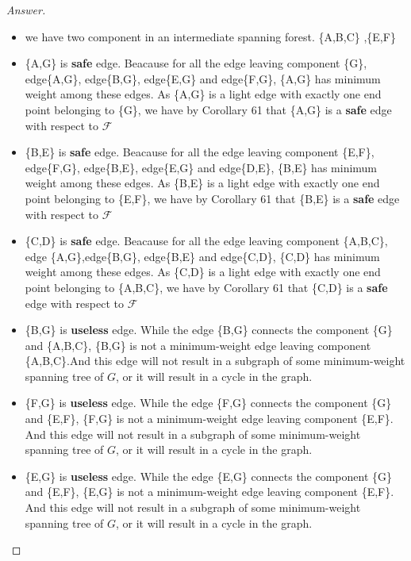 \documentclass[11pt]{article}
\theoremstyle{definition}
\theoremstyle{definition}
\theoremstyle{definition}
\begin{document}
\begin{proof}[Answer]
\begin{itemize}

\item we have two component in an intermediate spanning forest. \{A,B,C\} ,\{E,F\}
\item \{A,G\} is \textbf{safe} edge. Beacause for all the edge leaving component \{G\}, edge\{A,G\}, edge\{B,G\}, edge\{E,G\} and edge\{F,G\}, \{A,G\} has minimum weight among these edges. As \{A,G\} is a light edge with exactly one end point belonging to \{G\}, we have by Corollary 61 that \{A,G\} is a \textbf{safe} edge with respect to $\mathcal{F}$

\item \{B,E\} is \textbf{safe} edge.  Beacause for all the edge leaving component \{E,F\}, edge\{F,G\}, edge\{B,E\}, edge\{E,G\} and edge\{D,E\}, \{B,E\} has minimum weight among these edges. As \{B,E\} is a light edge with exactly one end point belonging to \{E,F\}, we have by Corollary 61 that \{B,E\} is a \textbf{safe} edge with respect to $\mathcal{F}$

\item \{C,D\} is \textbf{safe} edge. Beacause for all the edge leaving component \{A,B,C\}, edge \{A,G\},edge\{B,G\}, edge\{B,E\} and edge\{C,D\}, \{C,D\} has minimum weight among these edges. As \{C,D\} is a light edge with exactly one end point belonging to \{A,B,C\}, we have by Corollary 61 that \{C,D\} is a \textbf{safe} edge with respect to $\mathcal{F}$ 

\item \{B,G\}  is \textbf{useless} edge. While the edge \{B,G\} connects the component \{G\} and \{A,B,C\}, \{B,G\} is not a minimum-weight edge leaving component \{A,B,C\}.And this edge will not result in a subgraph of some minimum-weight spanning tree of $G$, or it will result in a cycle in the graph.

\item \{F,G\} is \textbf{useless} edge. While the edge \{F,G\} connects the component \{G\} and \{E,F\}, \{F,G\} is not a minimum-weight edge leaving component \{E,F\}. And this edge will not result in a subgraph of some minimum-weight spanning tree of $G$, or it will result in a cycle in the graph.

\item \{E,G\} is \textbf{useless} edge. While the edge \{E,G\} connects the component \{G\} and \{E,F\}, \{E,G\} is not a minimum-weight edge leaving component \{E,F\}. And this edge will not result in a subgraph of some minimum-weight spanning tree of $G$, or it will result in a cycle in the graph.


\end{itemize}
\end{proof}
\end{document}
